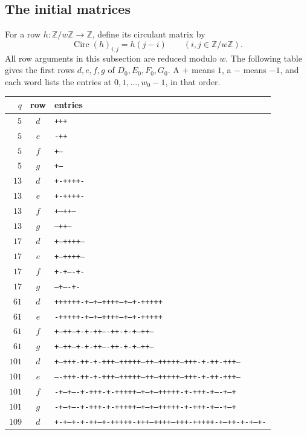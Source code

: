 \documentclass[10pt]{article}
\begin{document}
\subsection{The initial matrices}

For a row $h\colon\mathbb Z/w\mathbb Z\to\mathbb Z$, define its circulant
matrix by
\[
 \operatorname{Circ}(h)_{i,j}=h(j-i)
 \qquad(i,j\in\mathbb Z/w\mathbb Z).
\]
All row arguments in this subsection are reduced modulo $w$.
The following table gives the first rows $d,e,f,g$ of
$D_0,E_0,F_0,G_0$. A $+$ means $1$, a $-$ means $-1$, and each word lists
the entries at $0,1,\ldots,w_0-1$, in that order.

\begin{center}\scriptsize
\begin{tabular}{rcl}
$q$&row&entries\\\hline
$5$&$d$&\texttt{+++}\\
$5$&$e$&\texttt{-++}\\
$5$&$f$&\texttt{+--}\\
$5$&$g$&\texttt{+--}\\
\hline
$13$&$d$&\texttt{+-++++-}\\
$13$&$e$&\texttt{+-++++-}\\
$13$&$f$&\texttt{+--++--}\\
$13$&$g$&\texttt{---++--}\\
\hline
$17$&$d$&\texttt{+--++++--}\\
$17$&$e$&\texttt{+--++++--}\\
$17$&$f$&\texttt{+-+----+-}\\
$17$&$g$&\texttt{--+----+-}\\
\hline
$61$&$d$&\texttt{++++++-+--+---++++---+--+-+++++}\\
$61$&$e$&\texttt{-+++++-+--+---++++---+--+-+++++}\\
$61$&$f$&\texttt{+--++---+-+-++----++-+-+---++--}\\
$61$&$g$&\texttt{+--++---+-+-++----++-+-+---++--}\\
\hline
$101$&$d$&\texttt{+---+++-++-+-+++--+++++--++--+++++--+++-+-++-+++---}\\
$101$&$e$&\texttt{----+++-++-+-+++--+++++--++--+++++--+++-+-++-+++---}\\
$101$&$f$&\texttt{-+--+----+-+++-+-+++++--+--+--+++++-+-+++-+----+--+}\\
$101$&$g$&\texttt{-+--+----+-+++-+-+++++--+--+--+++++-+-+++-+----+--+}\\
\hline
$109$&$d$&\texttt{+-+--+-+-++--+-+++++-+++--++++--+++-+++++-+--++-+-+--+-}\\

\end{tabular}
\end{center}
\end{document}
